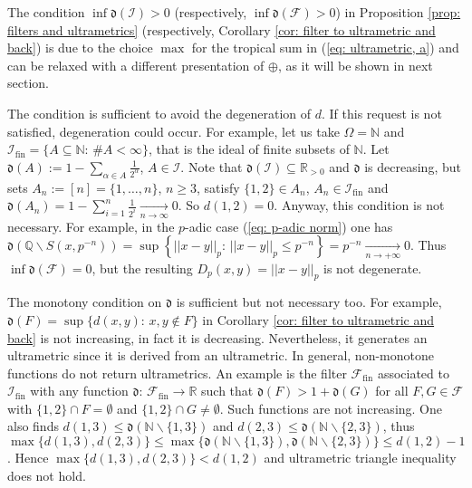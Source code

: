 \documentclass[11pt,british,reqno]{article}
\numberwithin{equation}{section}
\numberwithin{figure}{section}
\numberwithin{table}{section}
\theoremstyle{definition}
\theoremstyle{definition}
\theoremstyle{plain}
\theoremstyle{plain}
\theoremstyle{remark}
\theoremstyle{plain}
\numberwithin{equation}{section}
\numberwithin{figure}{section}
\numberwithin{table}{section}
\theoremstyle{plain}
\begin{document}
The condition $\inf\mathfrak{d}(\mathcal{I})>0$ (respectively, $\inf\mathfrak{d}(\mathcal{F})>0$) in Proposition \ref{prop: filters and ultrametrics} (respectively, Corollary \ref{cor: filter to ultrametric and back}) is due to the choice $\max$ for the tropical sum in (\ref{eq: ultrametric, a}) and can be relaxed with a different presentation of $\oplus$, as it will be shown in next section. 

The condition is sufficient to avoid the degeneration of $d$. If this request is not satisfied, degeneration
could occur. For example, let us take $\Omega=\mathbb{N}$ and $\mathcal{I}_{\mathrm{fin}}=\{A\subseteq\mathbb{N}:\,\#A<\infty\}$,
that is the ideal of finite subsets of $\mathbb{N}$. Let ${\displaystyle \mathfrak{d}(A):=1-\sum_{\alpha\in A}\frac{1}{2^{\alpha}}}$,
$A\in\mathcal{I}$. Note that $\mathfrak{d}(\mathcal{I})\subseteq\mathbb{R}_{>0}$
and $\mathfrak{d}$ is decreasing, but sets $A_{n}:=[n]=\{1,\dots,n\}$,
$n\geq3$, satisfy $\{1,2\}\in A_{n}$, $A_{n}\in\mathcal{I}_{\mathrm{fin}}$
and ${\displaystyle \mathfrak{d}(A_{n})=1-\sum_{i=1}^{n}\frac{1}{2^{i}}}\underset{n\rightarrow\infty}{\longrightarrow}0$.
So $d(1,2)=0$. Anyway, this condition is not necessary. For example,
in the $p$-adic case (\ref{eq: p-adic norm}) one has $\mathfrak{d}(\mathbb{Q}\backslash S(x,p^{-n}))=\sup\left\{ ||x-y||_{p}:\,||x-y||_{p}\leq p^{-n}\right\} =p^{-n}\underset{n\rightarrow+\infty}{\longrightarrow}0$.
Thus $\inf\mathfrak{d}(\mathcal{F})=0$, but the resulting $D_{p}(x,y)=||x-y||_{p}$
is not degenerate. 

The monotony condition on $\mathfrak{d}$ is sufficient but not necessary
too. For example, $\mathfrak{d}(F)=\sup\{d(x,y):\,x,y\notin F\}$
in Corollary \ref{cor: filter to ultrametric and back} is not increasing,
in fact it is decreasing. Nevertheless, it generates an ultrametric
since it is derived from an ultrametric. In general, non-monotone
functions do not return ultrametrics. An example is the filter $\mathcal{F}_{\mathrm{fin}}$
associated to $\mathcal{I}_{\mathrm{fin}}$ with any function $\mathfrak{d}:\,\mathcal{F}_{\mathrm{fin}}\longrightarrow\mathbb{R}$
such that $\mathfrak{d}(F)>1+\mathfrak{d}(G)$ for all $F,G\in\mathcal{F}$
with $\{1,2\}\cap F=\emptyset$ and $\{1,2\}\cap G\neq\emptyset$.
Such functions are not increasing. One also finds $d(1,3)\leq\mathfrak{d}(\mathbb{N}\backslash\{1,3\})$
and $d(2,3)\leq\mathfrak{d}(\mathbb{N}\backslash\{2,3\})$, thus $\max\{d(1,3),d(2,3)\}\leq\max\{\mathfrak{d}(\mathbb{N}\backslash\{1,3\}),\mathfrak{d}(\mathbb{N}\backslash\{2,3\})\}\leq d(1,2)-1$.
Hence $\max\{d(1,3),d(2,3)\}<d(1,2)$ and ultrametric triangle inequality
does not hold. 
\end{document}
